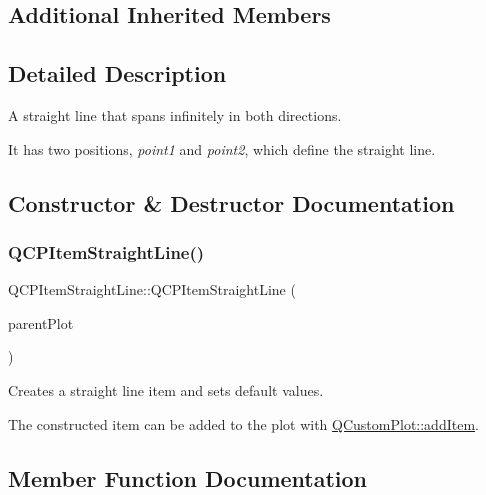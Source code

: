 \subsection*{Additional Inherited Members}


\subsection{Detailed Description}
A straight line that spans infinitely in both directions. 

 It has two positions, {\itshape point1} and {\itshape point2}, which define the straight line. 

\subsection{Constructor \& Destructor Documentation}
\mbox{\label{class_q_c_p_item_straight_line_a41fd2e1f006983449eca9830930c3b10}} 
\subsubsection{\texorpdfstring{Q\+C\+P\+Item\+Straight\+Line()}{QCPItemStraightLine()}}
{\footnotesize\ttfamily Q\+C\+P\+Item\+Straight\+Line\+::\+Q\+C\+P\+Item\+Straight\+Line (\begin{DoxyParamCaption}\item[{\mbox{\hyperlink{class_q_custom_plot}{Q\+Custom\+Plot}} $\ast$}]{parent\+Plot }\end{DoxyParamCaption})}

Creates a straight line item and sets default values.

The constructed item can be added to the plot with \mbox{\hyperlink{class_q_custom_plot_aa500620379262321685cb7a7674cbd2a}{Q\+Custom\+Plot\+::add\+Item}}. 

\subsection{Member Function Documentation}
\mbox{\label{class_q_c_p_item_straight_line_a1e5d99d79efb5871600c72bcd2891a0f}} 
